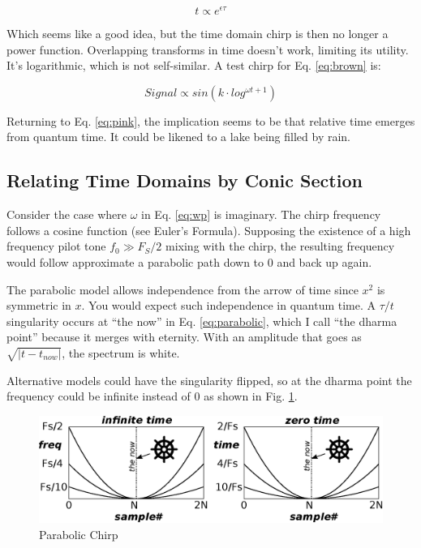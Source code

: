 \begin{equation} \label{eq:brown}
t \propto e^{\epsilon \tau}
\end{equation}

Which seems like a good idea,
but the time domain chirp is then no longer a power function.
Overlapping transforms in time doesn't work, limiting its utility.
It's logarithmic, which is not self-similar.
A test chirp for Eq. \ref{eq:brown} is:

\begin{equation} \label{eq:wb}
Signal \propto sin(k \cdot log^{\omega t + 1})
\end{equation}

Returning to Eq. \ref{eq:pink}, the implication seems to be that relative time
emerges from quantum time. It could be likened to a lake being filled by rain.

\subsection{Relating Time Domains by Conic Section}

Consider the case where $\omega$ in Eq. \ref{eq:wp} is imaginary.
The chirp frequency follows a cosine function (see Euler's Formula).
Supposing the existence of a high frequency pilot tone $f_0 \gg F_S/2$ mixing
with the chirp, the resulting frequency would follow approximate a
parabolic path down to 0 and back up again.

The parabolic model allows independence from the arrow of time since $x^2$ is
symmetric in $x$. You would expect such independence in quantum time.
A $\tau/t$ singularity occurs at ``the now'' in Eq. \ref{eq:parabolic},
which I call ``the dharma point'' because it merges with eternity.
With an amplitude that goes as $\sqrt{|t - t_{now}|}$, the spectrum is white.

Alternative models could have the singularity flipped,
so at the dharma point the frequency could be infinite instead of
0 as shown in Fig. \ref{fig:parabolic}.

\begin{figure} \label{fig:parabolic}
    \centering
    \includegraphics[width=0.95\linewidth]{../source/parabola_e}
    \caption[Hypothetical Parabolic Frequency Chirp]{Parabolic Chirp}
\end{figure}

